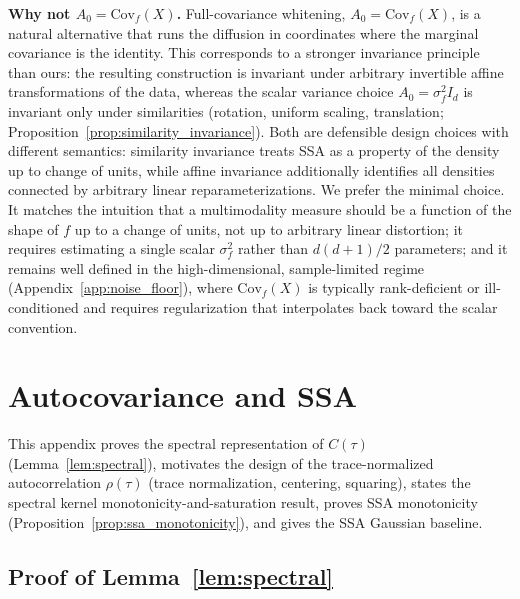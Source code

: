 \documentclass{article}
\newcommand{\Cov}{\mathrm{Cov}}
\begin{document}
\textbf{Why not $A_0 = \Cov_f(X)$.}
Full-covariance whitening, $A_0 = \Cov_f(X)$, is a natural alternative
that runs the diffusion in coordinates where the marginal covariance is
the identity. This corresponds to a stronger invariance principle than
ours: the resulting construction is invariant under arbitrary
invertible affine transformations of the data, whereas the scalar
variance choice $A_0 = \sigma_f^2 I_d$ is invariant only under
similarities (rotation, uniform scaling, translation;
Proposition~\ref{prop:similarity_invariance}). Both are defensible
design choices with different semantics: similarity invariance treats
SSA as a property of the density up to change of units, while affine
invariance additionally identifies all densities connected by arbitrary
linear reparameterizations. We prefer the minimal choice. It matches
the intuition that a multimodality measure should be a function of the
shape of $f$ up to a change of units, not up to arbitrary linear
distortion; it requires estimating a single scalar $\sigma_f^2$ rather
than $d(d+1)/2$ parameters; and it remains well defined in the
high-dimensional, sample-limited regime
(Appendix~\ref{app:noise_floor}), where $\Cov_f(X)$ is typically
rank-deficient or ill-conditioned and requires regularization that
interpolates back toward the scalar convention.


\section{Autocovariance and SSA}
\label{app:autocov_ssa}

This appendix proves the spectral representation of $C(\tau)$ (Lemma~\ref{lem:spectral}), motivates the design of the trace-normalized autocorrelation $\rho(\tau)$ (trace normalization, centering, squaring), states the spectral kernel monotonicity-and-saturation result, proves SSA monotonicity (Proposition~\ref{prop:ssa_monotonicity}), and gives the SSA Gaussian baseline.

\subsection{Proof of Lemma~\ref{lem:spectral}}
\label{app:spectral}
\end{document}
